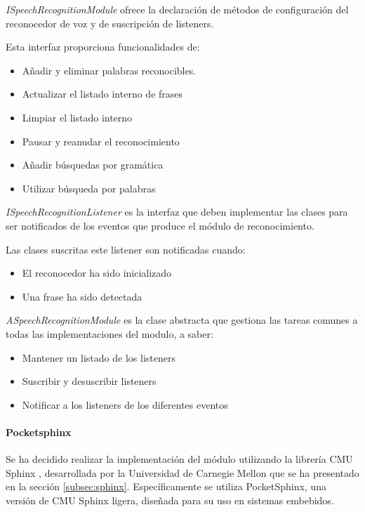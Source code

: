 \textit{ISpeechRecognitionModule} ofrece la declaración de métodos de configuración del reconocedor de  voz y de suscripción de listeners.


Esta interfaz proporciona funcionalidades de:
\begin{itemize}
 	\item Añadir y eliminar palabras reconocibles.
 	\item Actualizar el listado interno de frases
	\item Limpiar el listado interno
	\item Pausar y reanudar el reconocimiento
	\item Añadir búsquedas por gramática
	\item Utilizar búsqueda por palabras
 	 
\end{itemize}



\textit{ISpeechRecognitionListener} es la interfaz que deben implementar las clases para ser notificados de los eventos que produce el módulo de reconocimiento.

Las clases suscritas este listener son notificadas cuando:
\begin{itemize}
	\item El reconocedor ha sido inicializado
	\item Una frase ha sido detectada
\end{itemize}

   


\textit{ASpeechRecognitionModule} es la clase abstracta que gestiona las tareas comunes a todas las implementaciones del modulo, a saber:

\begin{itemize}
	\item Mantener un listado de los listeners
	\item Suscribir y desuscribir listeners
	\item Notificar a los listeners de los diferentes eventos
\end{itemize}





\paragraph*{Pocketsphinx\\}


Se ha decidido realizar la implementación del módulo utilizando la librería CMU Sphinx \cite{cmusphinx}, desarrollada por la Universidad de Carnegie Mellon que se ha presentado en la sección \ref{subsec:sphinx}.
Específicamente se utiliza PocketSphinx, una versión de CMU Sphinx ligera, diseñada para su uso en sistemas embebidos.

